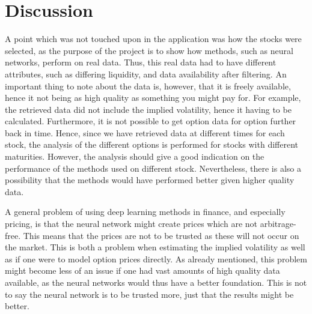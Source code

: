 \chapter{Discussion}\label{Ch.Discussion}
A point which was not touched upon in the application was how the stocks were selected, as the purpose of the project is to show how methods, such as neural networks, perform on real data. Thus, this real data had to have different attributes, such as differing liquidity, and data availability after filtering. An important thing to note about the data is, however, that it is freely available, hence it not being as high quality as something you might pay for. For example, the retrieved data did not include the implied volatility, hence it having to be calculated. Furthermore, it is not possible to get option data for option further back in time. Hence, since we have retrieved data at different times for each stock, the analysis of the different options is performed for stocks with different maturities. However, the analysis should give a good indication on the performance of the methods used on different stock. Nevertheless, there is also a possibility that the methods would have performed better given higher quality data. 

A general problem of using deep learning methods in finance, and especially pricing, is that the neural network might create prices which are not arbitrage-free. This means that the prices are not to be trusted as these will not occur on the market. This is both a problem when estimating the implied volatility as well as if one were to model option prices directly. As already mentioned, this problem might become less of an issue if one had vast amounts of high quality data available, as the neural networks would thus have a better foundation. This is not to say the neural network is to be trusted more, just that the results might be better.


